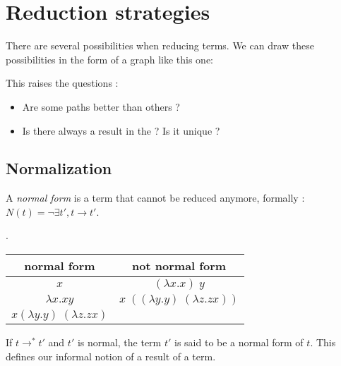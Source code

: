 \section{Reduction strategies}

  There are several possibilities when reducing terms. We can draw these
  possibilities in the form of a graph like this one:

  \begin{center}
  \end{center}

  This raises the questions : \begin{itemize}
    \item Are some paths better than others ?
    \item Is there always a result in the ? Is it unique ?
  \end{itemize}

  \subsection{Normalization}

  A \textit{normal form} is a term that cannot be reduced anymore,
  formally : $N(t) = \neg \exists t', t \to t' $.

  \exam.

  \begin{tabular}{c|c}
    normal form & not normal form \\
    \hline
    $x$ & $(\lambda x.x)\; y$ \\
    $\lambda x.xy$ & $x\; ((\lambda y.y)\;(\lambda z.zx))$ \\
    $x (\lambda y.y)\;(\lambda z.zx)$ &
  \end{tabular}

  \vspace{0.5cm}

  If $t\to^* t'$ and $t'$ is normal, the term $t'$ is said to be a normal form
  of $t$. This defines our informal notion of a result of a term.

